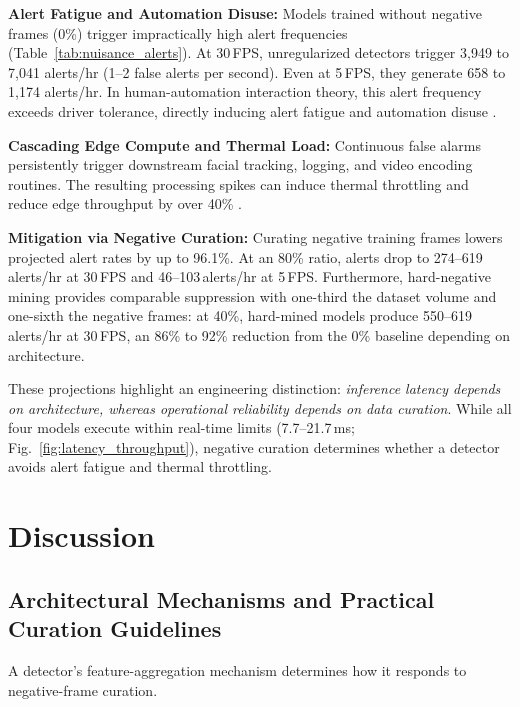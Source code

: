 \documentclass[conference]{IEEEtran}
\begin{document}
\textbf{Alert Fatigue and Automation Disuse:} Models trained without negative frames (0\%) trigger impractically high alert frequencies (Table~\ref{tab:nuisance_alerts}). At 30\,FPS, unregularized detectors trigger 3{,}949 to 7{,}041 alerts/hr (1--2 false alerts per second). Even at 5\,FPS, they generate 658 to 1{,}174 alerts/hr. In human-automation interaction theory, this alert frequency exceeds driver tolerance, directly inducing alert fatigue and automation disuse \cite{lambert2026chinese, parasuraman1997humans}.

\textbf{Cascading Edge Compute and Thermal Load:} Continuous false alarms persistently trigger downstream facial tracking, logging, and video encoding routines. The resulting processing spikes can induce thermal throttling and reduce edge throughput by over 40\% \cite{florez2024real, benoitcattin2020thermal}.

\textbf{Mitigation via Negative Curation:} Curating negative training frames lowers projected alert rates by up to 96.1\%. At an 80\% ratio, alerts drop to 274--619\,alerts/hr at 30\,FPS and 46--103\,alerts/hr at 5\,FPS. Furthermore, hard-negative mining provides comparable suppression with one-third the dataset volume and one-sixth the negative frames: at 40\%, hard-mined models produce 550--619\,alerts/hr at 30\,FPS, an 86\% to 92\% reduction from the 0\% baseline depending on architecture.

These projections highlight an engineering distinction: \textit{inference latency depends on architecture, whereas operational reliability depends on data curation}. While all four models execute within real-time limits (7.7--21.7\,ms; Fig.~\ref{fig:latency_throughput}), negative curation determines whether a detector avoids alert fatigue and thermal throttling.

\section{Discussion}
\label{sec:discussion}

\subsection{Architectural Mechanisms and Practical Curation Guidelines}
\label{subsec:guidelines}
A detector's feature-aggregation mechanism determines how it responds to negative-frame curation.
\end{document}
